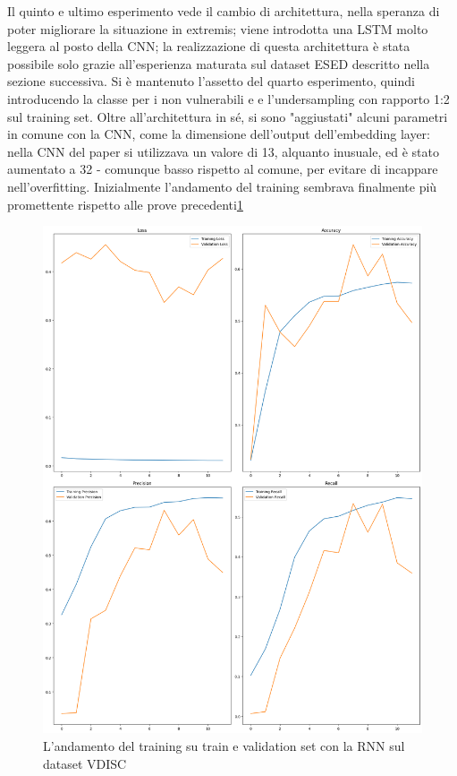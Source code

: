 \documentclass[conference]{IEEEtran}
\begin{document}
Il quinto e ultimo esperimento vede il cambio di architettura, nella speranza di poter migliorare la situazione in extremis; viene introdotta una LSTM molto leggera al posto della CNN; la realizzazione di questa architettura è stata possibile solo grazie all'esperienza maturata sul dataset ESED descritto nella sezione successiva.  Si è mantenuto l'assetto del quarto esperimento, quindi introducendo la classe per i non vulnerabili e e l'undersampling con rapporto 1:2 sul training set. Oltre all'architettura in sé, si sono "aggiustati" alcuni parametri in comune con la CNN, come la dimensione dell'output dell'embedding layer: nella CNN del paper si utilizzava un valore di 13, alquanto inusuale, ed è stato aumentato a 32 - comunque basso rispetto al comune, per evitare di incappare nell'overfitting. Inizialmente l'andamento del training sembrava finalmente più promettente rispetto alle prove precedenti\ref{fig:train-RNN-VDISC}
%
\begin{figure}[h]
    \centering
    \includegraphics[width=\columnwidth]{images/VDISC/last_RNN/training_val.png}
    \caption{L'andamento del training su train e validation set con la RNN sul dataset VDISC}
    \label{fig:train-RNN-VDISC}
\end{figure}
\end{document}
